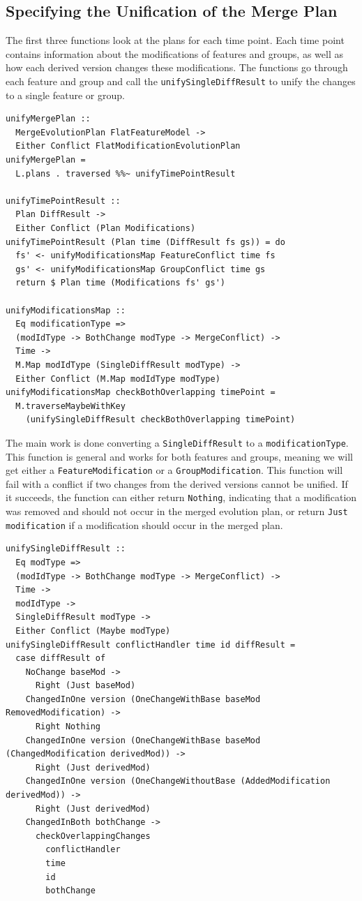 \documentclass[a4paper,english]{ifimaster}
\begin{document}
\subsection{Specifying the Unification of the Merge Plan}%
\label{sub:specifying_the_unification_of_the_merge_plan}

The first three functions look at the plans for each time point. Each time point contains information about the modifications of features and groups, as well as how each derived version changes these modifications. The functions go through each feature and group and call the \texttt{unify\-Single\-Diff\-Result} to unify the changes to a single feature or group.

\begin{verbatim}
unifyMergePlan ::
  MergeEvolutionPlan FlatFeatureModel ->
  Either Conflict FlatModificationEvolutionPlan
unifyMergePlan =
  L.plans . traversed %%~ unifyTimePointResult

unifyTimePointResult ::
  Plan DiffResult ->
  Either Conflict (Plan Modifications)
unifyTimePointResult (Plan time (DiffResult fs gs)) = do
  fs' <- unifyModificationsMap FeatureConflict time fs
  gs' <- unifyModificationsMap GroupConflict time gs
  return $ Plan time (Modifications fs' gs')

unifyModificationsMap ::
  Eq modificationType =>
  (modIdType -> BothChange modType -> MergeConflict) ->
  Time ->
  M.Map modIdType (SingleDiffResult modType) ->
  Either Conflict (M.Map modIdType modType)
unifyModificationsMap checkBothOverlapping timePoint =
  M.traverseMaybeWithKey
    (unifySingleDiffResult checkBothOverlapping timePoint)
\end{verbatim}

The main work is done converting a \texttt{Single\-Diff\-Result} to a \texttt{modification\-Type}. This function is general and works for both features and groups, meaning we will get either a \texttt{Feature\-Modification} or a \texttt{Group\-Modification}. This function will fail with a conflict if two changes from the derived versions cannot be unified. If it succeeds, the function can either return \texttt{Nothing}, indicating that a modification was removed and should not occur in the merged evolution plan, or return \texttt{Just modification} if a modification should occur in the merged plan.

\begin{verbatim}
unifySingleDiffResult ::
  Eq modType =>
  (modIdType -> BothChange modType -> MergeConflict) ->
  Time ->
  modIdType ->
  SingleDiffResult modType ->
  Either Conflict (Maybe modType)
unifySingleDiffResult conflictHandler time id diffResult =
  case diffResult of
    NoChange baseMod ->
      Right (Just baseMod)
    ChangedInOne version (OneChangeWithBase baseMod RemovedModification) ->
      Right Nothing
    ChangedInOne version (OneChangeWithBase baseMod (ChangedModification derivedMod)) ->
      Right (Just derivedMod)
    ChangedInOne version (OneChangeWithoutBase (AddedModification derivedMod)) ->
      Right (Just derivedMod)
    ChangedInBoth bothChange ->
      checkOverlappingChanges
        conflictHandler
        time
        id
        bothChange
\end{verbatim}
\end{document}
